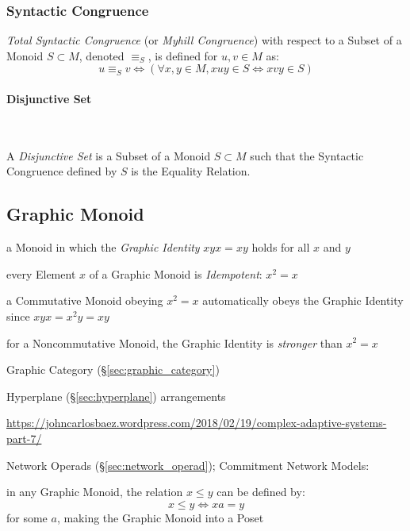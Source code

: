 \subsubsection{Syntactic Congruence}\label{sec:syntactic_congruence}

\emph{Total Syntactic Congruence} (or \emph{Myhill Congruence}) with
respect to a Subset of a Monoid $S \subset M$, denoted $\equiv_S$, is
defined for $u,v \in M$ as:
\[
  u \equiv_S v \Leftrightarrow
  (\forall x,y \in M, xuy \in S \Leftrightarrow xvy \in S)
\]



\paragraph{Disjunctive Set}\label{sec:disjunctive_set}\hfill \\\hfill

A \emph{Disjunctive Set} is a Subset of a Monoid $S \subset M$ such
that the Syntactic Congruence defined by $S$ is the Equality Relation.



\subsection{Graphic Monoid}\label{sec:graphic_monoid}

a Monoid in which the \emph{Graphic Identity} $xyx = xy$ holds for all $x$ and
$y$

every Element $x$ of a Graphic Monoid is \emph{Idempotent}: $x^2 = x$

a Commutative Monoid obeying $x^2 = x$ automatically obeys the Graphic Identity
since $xyx = x^2y = xy$

for a Noncommutative Monoid, the Graphic Identity is \emph{stronger} than $x^2
= x$


Graphic Category (\S\ref{sec:graphic_category})

Hyperplane (\S\ref{sec:hyperplane}) arrangements

\url{https://johncarlosbaez.wordpress.com/2018/02/19/complex-adaptive-systems-part-7/}

Network Operads (\S\ref{sec:network_operad}); Commitment Network Models:

in any Graphic Monoid, the relation $x \leq y$ can be defined by:
\[
  x \leq y \Leftrightarrow x a = y
\]
for some $a$, making the Graphic Monoid into a Poset

